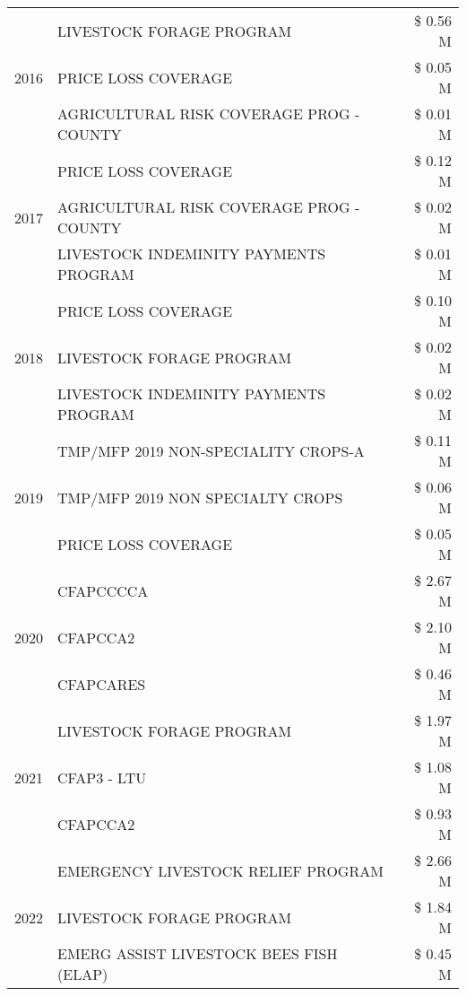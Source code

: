 \begin{tabular}{llr}
\cline{1-3}
\multirow[t]{3}{*}{2016} & LIVESTOCK FORAGE PROGRAM & \$ 0.56 M \\
 & PRICE LOSS COVERAGE & \$ 0.05 M \\
 & AGRICULTURAL RISK COVERAGE PROG - COUNTY & \$ 0.01 M \\
\cline{1-3}
\multirow[t]{3}{*}{2017} & PRICE LOSS COVERAGE & \$ 0.12 M \\
 & AGRICULTURAL RISK COVERAGE PROG - COUNTY & \$ 0.02 M \\
 & LIVESTOCK INDEMINITY PAYMENTS PROGRAM & \$ 0.01 M \\
\cline{1-3}
\multirow[t]{3}{*}{2018} & PRICE LOSS COVERAGE & \$ 0.10 M \\
 & LIVESTOCK FORAGE PROGRAM & \$ 0.02 M \\
 & LIVESTOCK INDEMINITY PAYMENTS PROGRAM & \$ 0.02 M \\
\cline{1-3}
\multirow[t]{3}{*}{2019} & TMP/MFP 2019 NON-SPECIALITY CROPS-A & \$ 0.11 M \\
 & TMP/MFP 2019 NON SPECIALTY CROPS & \$ 0.06 M \\
 & PRICE LOSS COVERAGE & \$ 0.05 M \\
\cline{1-3}
\multirow[t]{3}{*}{2020} & CFAPCCCCA & \$ 2.67 M \\
 & CFAPCCA2 & \$ 2.10 M \\
 & CFAPCARES & \$ 0.46 M \\
\cline{1-3}
\multirow[t]{3}{*}{2021} & LIVESTOCK FORAGE PROGRAM & \$ 1.97 M \\
 & CFAP3 - LTU & \$ 1.08 M \\
 & CFAPCCA2 & \$ 0.93 M \\
\cline{1-3}
\multirow[t]{3}{*}{2022} & EMERGENCY LIVESTOCK RELIEF PROGRAM & \$ 2.66 M \\
 & LIVESTOCK FORAGE PROGRAM & \$ 1.84 M \\
 & EMERG ASSIST LIVESTOCK BEES FISH (ELAP) & \$ 0.45 M \\
\cline{1-3}
\bottomrule
\end{tabular}
